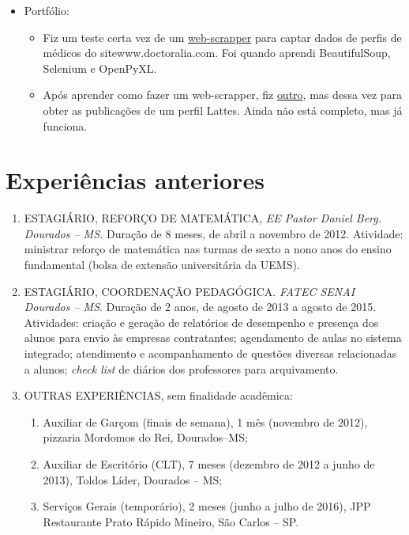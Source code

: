 \documentclass[11pt]{article}
\begin{document}
\begin{itemize}
\item Portfólio: 
\begin{itemize}
\item Fiz um teste certa vez de um \href{https://github.com/j5r/web-scrapper-doctoralia}{web-scrapper} para captar dados de perfis de médicos do site\linebreak www.doctoralia.com. Foi quando aprendi BeautifulSoup, Selenium e OpenPyXL.
\item Após aprender como fazer um web-scrapper, fiz \href{https://github.com/j5r/web-scrapper-lattes-productions}{outro}, mas dessa vez para obter as publicações de um perfil Lattes. Ainda não está completo, mas  já funciona.
\end{itemize}

\end{itemize}


\section{Experiências anteriores \dotfill}
\begin{enumerate}
\item ESTAGIÁRIO, REFORÇO DE MATEMÁTICA, \textit{EE Pastor Daniel Berg. Dourados -- MS.} Duração de 8 meses, de abril a novembro de 2012. Atividade: ministrar reforço de matemática nas turmas de sexto a nono anos do ensino fundamental (bolsa de extensão universitária da UEMS).

\item ESTAGIÁRIO, COORDENAÇÃO PEDAGÓGICA. {\it FATEC SENAI Dourados -- MS}. Duração de 2 anos, de agosto de 2013 a agosto de 2015. Atividades: criação e geração de relatórios de desempenho e presença dos alunos para envio às empresas contratantes; agendamento de aulas no sistema integrado; atendimento e acompanhamento de questões diversas relacionadas a alunos; {\it check list} de diários dos professores para arquivamento. 


\item OUTRAS EXPERIÊNCIAS, sem finalidade acadêmica:
\begin{enumerate}
\item  Auxiliar de Garçom (finais de semana), 1 mês (novembro de 2012), pizzaria Mordomos do Rei, Dourados--MS;
\item Auxiliar de Escritório (CLT), 7 meses (dezembro de 2012 a junho de 2013), Toldos Líder, Dourados -- MS;
\item  Serviços Gerais (temporário), 2 meses (junho a julho de 2016), JPP Restaurante Prato Rápido Mineiro, São Carlos -- SP.
\end{enumerate}
\end{enumerate}
\end{document}
